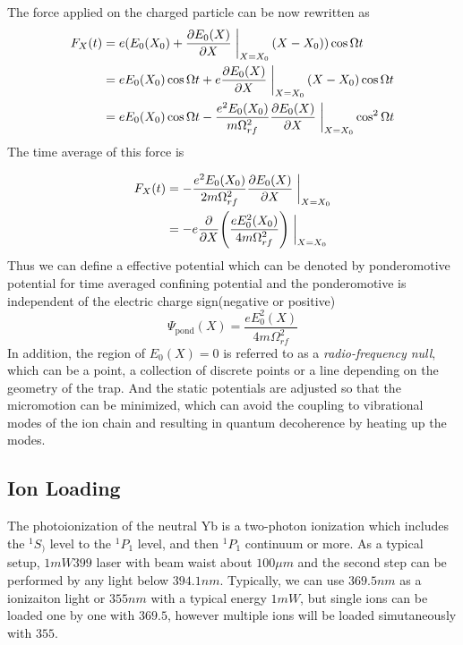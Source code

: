 The force applied on the charged particle can be now rewritten as
\begin{equation}
\begin{aligned}
    F_X(t)&=e(E_0(X_0)+\pdv{E_0(X)}{X}\eval{}_{X=X_0}\qty(X-X_0))\cos\Omega t\\
    &=eE_0(X_0)\cos\Omega t+e\pdv{E_0(X)}{X}\eval{}_{X=X_0}\qty(X-X_0)\cos\Omega t\\
    &=eE_0(X_0)\cos\Omega t-\frac{e^2E_0(X_0)}{m\Omega_{rf}^2}\pdv{E_0(X)}{X}\eval{}_{X=X_0}\cos^2\Omega t
\end{aligned}
\end{equation}
The time average of this force is

\begin{equation}\label{eq:timeaveraged}
\begin{aligned}
    F_X(t)&=-\frac{e^2E_0(X_0)}{2m\Omega_{rf}^2}\pdv{E_0(X)}{X}\eval{}_{X=X_0}\\
    &=-e\pdv{X}(\frac{eE_0^2(X_0)}{4m\Omega_{rf}^2})\eval{}_{X=X_0}
\end{aligned}
\end{equation}
Thus we can define a effective potential which can be denoted by ponderomotive potential for time averaged confining potential and the ponderomotive is independent of the electric charge sign(negative or positive)
\begin{equation}\label{eq:ponderomotive}
    \Psi_{\mathrm{pond}}(X)=\frac{eE_0^2(X)}{4m\Omega_{rf}^2}
\end{equation}
In addition, the region of $E_0(X)=0$ is referred to as a \emph{radio-frequency null}, which can be a point, a collection of discrete points or a line depending on the geometry of the trap. And the static potentials are adjusted so that the micromotion can be minimized, which can avoid the coupling to vibrational modes of the ion chain and resulting in quantum decoherence by heating up the modes.

\subsection{Ion Loading} %
\label{sub:ion_loading}
The photoionization of the neutral Yb is a two-photon ionization which includes the $^1S_)$ level to the $^1P_1$ level, and then $^1P_1$ continuum or more. As a typical setup, $1\unit{mW}  399$ laser with beam waist about $100\unit{\mu m}$ and the second step can be performed by any light below $394.1\unit{nm}$. Typically, we can use $369.5\unit{nm}$ as a ionizaiton light or $355\unit{nm}$ with a typical energy $1\unit{mW}$, but single ions can be loaded one by one with $369.5$, however multiple ions will be loaded simutaneously with $355$.

